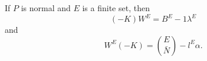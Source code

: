 If $P$ is normal and $E$ is a finite set, then
$$(-K)W^E = B^E - 1\lambda^E$$
and
$$W^E(-K) = \binom{E}{\bar{N}} - l^E\alpha.$$

